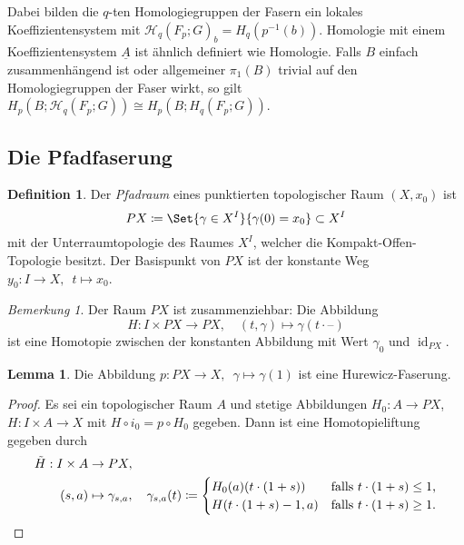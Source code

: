 \documentclass[11pt, a4paper, german]{article}
\theoremstyle{definition}
\newtheorem{lem}{Lemma}
\newtheorem{defn}{Definition}
\theoremstyle{remark}
\newtheorem*{bem}{Bemerkung}
\DeclareMathOperator{\id}{id} %
\newcommand{\blank}{\text{--}} %
\newcommand{\LH}{\mathcal{H}} %
\newcommand{\I}{I} %
\begin{document}

Dabei bilden die $q$-ten Homologiegruppen der Fasern ein lokales Koeffizientensystem mit $\LH_q(F_p; G)_b = H_q(p^{-1}(b))$.
Homologie mit einem Koeffizientensystem $\underline{A}$ ist ähnlich definiert wie Homologie.
Falls $B$ einfach zusammenhängend ist oder allgemeiner $\pi_1(B)$ trivial auf den Homologiegruppen der Faser wirkt, so gilt $H_p(B; \LH_q(F_p; G)) \cong H_p(B; H_q(F_p; G))$.

\subsection{Die Pfadfaserung}

\begin{defn}
  Der \emph{Pfadraum} eines punktierten topologischer Raum $(X, x_0)$ ist
  \[ PX \coloneqq \Set{\gamma \in X^\I}{\gamma(0) = x_0} \subset X^I \]
  mit der Unterraumtopologie des Raumes $X^I$, welcher die Kompakt-Offen-Topologie besitzt.
  Der Basispunkt von $PX$ ist der konstante Weg $y_0 : \I \to X, \enspace t \mapsto x_0$.
\end{defn}

\begin{bem}
  Der Raum $PX$ ist zusammenziehbar: Die Abbildung
  \[
    H : \I \times PX \to PX, \quad
    (t, \gamma) \mapsto \gamma(t \cdot \blank)
  \]
  ist eine Homotopie zwischen der konstanten Abbildung mit Wert $\gamma_0$ und $\id_{PX}$.
\end{bem}

\begin{lem}
  Die Abbildung
  $
    p : PX \to X, \enspace
    \gamma \mapsto \gamma(1)
  $
  ist eine Hurewicz-Faserung.
\end{lem}

\begin{proof}
  Es sei ein topologischer Raum $A$ und stetige Abbildungen $H_0 : A \to PX$, $H : \I \times A \to X$ mit $H \circ i_0 = p \circ H_0$ gegeben.
  Dann ist eine Homotopieliftung gegeben durch
  \begin{align*}
    \tilde{H} : \I \times A & \to PX, \\
    (s, a) & \mapsto \gamma_{s, a}, \quad
    \gamma_{s, a}(t) \coloneqq \begin{cases}
      H_0(a)(t \cdot (1+s)) & \text{falls $t \cdot (1+s) \leq 1$,} \\
      H(t \cdot (1+s) - 1, a) & \text{falls $t \cdot (1+s) \geq 1$.}
      \qedhere
    \end{cases}
  \end{align*}
\end{proof}
\end{document}
